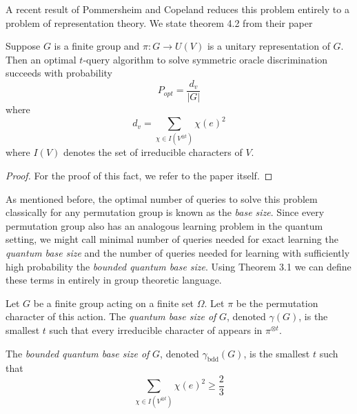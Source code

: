 A recent result of Pommersheim and Copeland \cite{jamie} reduces this problem entirely to a problem of 
representation theory. We state theorem 4.2 from their paper
    
\begin{theorem}
    Suppose $G$ is a finite group and $\pi : G \rightarrow U(V)$ is a unitary representation of $G$. Then an 
    optimal $t$-query algorithm to solve symmetric oracle discrimination succeeds with probability
    \[
        P_{opt} = \frac{d_v}{|G|}
    \]
    where
    \[
        d_v = \sum_{\chi \in I(V^{\otimes t})} \chi(e)^2
    \]
    where $I(V)$ denotes the set of irreducible characters of $V$.
\end{theorem}

\begin{proof}
    For the proof of this fact, we refer to the paper itself.
\end{proof}


As mentioned before, the optimal number of queries to solve this problem classically for any permutation group is 
known as the \emph{base size}. Since every permutation group also has an analogous learning problem in the quantum 
setting, we might call minimal number of queries needed for exact learning the \emph{quantum base size} and the 
number of queries needed for learning with sufficiently high probability the \emph{bounded quantum base size}.
Using Theorem 3.1 we can define these terms in entirely in group theoretic language.
\begin{definition}
    Let $G$ be a finite group acting on a finite set $\Omega$. Let $\pi$ be the permutation character of this 
    action. The \emph{quantum base size of} $G$, denoted $\gamma (G)$, is the smallest $t$ such that every 
    irreducible character of appears in $\pi^{\otimes t}$.

    The \emph{bounded quantum base size of } $G$, denoted $\gamma_\text{bdd}(G)$, is the smallest $t$ such that
    \[
        \sum_{\chi \in I(V^{\otimes t})} \chi(e)^2 \geq \frac{2}{3}
    \]

\end{definition}































